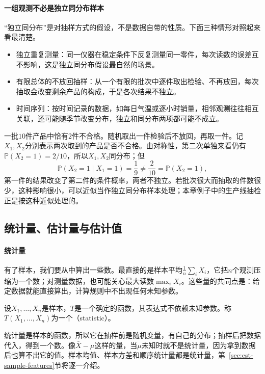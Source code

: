 \paragraph{一组观测不必是独立同分布样本}
“独立同分布”是对抽样方式的假设，不是数据自带的性质。下面三种情形对照起来看最清楚。
\begin{itemize}
  \item 独立重复测量：同一仪器在稳定条件下反复测量同一零件，每次读数的误差互不影响，这是独立同分布假设最自然的场景。
  \item 有限总体的不放回抽样：从一个有限的批次中逐件取出检验、不再放回，每次抽取会改变剩余产品的构成，于是各次结果不独立。
  \item 时间序列：按时间记录的数据，如每日气温或逐小时销量，相邻观测往往相互关联，还可能随季节改变分布，独立和同分布两项都可能不成立。
\end{itemize}

\begin{example}[不放回抽样破坏独立性]
\label{ex:est-without-replacement}
一批$10$件产品中恰有$2$件不合格。随机取出一件检验后不放回，再取一件。记$X_1,X_2$分别表示两次取到的产品是否不合格。由对称性，第二次单独来看仍有$\mathbb{P}(X_2=1)=2/10$，所以$X_1,X_2$同分布；但
\[
\mathbb{P}(X_2=1\mid X_1=1)=\frac{1}{9}\neq\frac{2}{10}=\mathbb{P}(X_2=1),
\]
第一件的结果改变了第二件的条件概率，两者不独立。若批次很大而抽取的件数很少，这种影响很小，可以近似当作独立同分布样本处理；本章例子中的生产线抽检正是按这种近似处理的。
\end{example}

\subsection{统计量、估计量与估计值}

\paragraph{统计量}
有了样本，我们要从中算出一些数。最直接的是样本平均$\frac1n\sum_{i}X_i$，它把$n$个观测压缩为一个数；对测量数据，也可能关心最大读数$\max_iX_i$。这些量的共同点是：给定数据就能直接算出，计算规则中不出现任何未知参数。

\begin{definition}[统计量]
\label{def:est-statistic}
设$X_1,\dots,X_n$是样本，$T$是一个确定的函数，其表达式不依赖未知参数。称$T(X_1,\dots,X_n)$为一个（statistic）。
\end{definition}

统计量是样本的函数，所以它在抽样前是随机变量，有自己的分布；抽样后把数据代入，得到一个数。像$\bar X-\mu$这样的量，当$\mu$未知时就不是统计量，因为拿到数据后也算不出它的值。样本均值、样本方差和顺序统计量都是统计量，第~\ref{sec:est-sample-features}节将逐一介绍。

